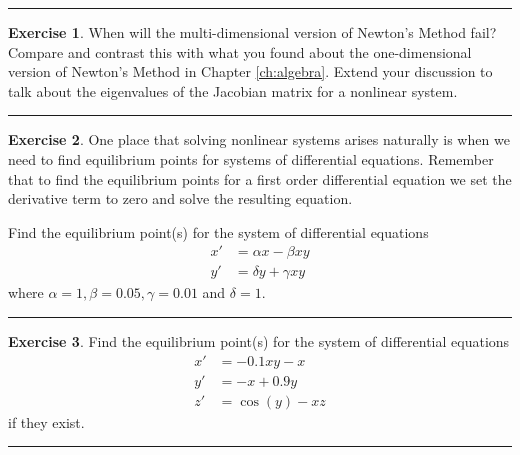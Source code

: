 \documentclass[
]{book}
\theoremstyle{definition}
\theoremstyle{definition}
\theoremstyle{definition}
\newtheorem{exercise}{Exercise}[chapter]
\theoremstyle{remark}
\begin{document}
\begin{center}\rule{0.5\linewidth}{0.5pt}\end{center}

\begin{exercise}
\protect\hypertarget{exr:unnamed-chunk-859}{}{\label{exr:unnamed-chunk-859} }When will the multi-dimensional version of Newton's Method fail? Compare and contrast this with what you found about the one-dimensional version of Newton's Method in Chapter \ref{ch:algebra}. Extend your discussion to talk about the eigenvalues of the Jacobian matrix for a nonlinear system.
\end{exercise}

\begin{center}\rule{0.5\linewidth}{0.5pt}\end{center}

\begin{exercise}
\protect\hypertarget{exr:unnamed-chunk-860}{}{\label{exr:unnamed-chunk-860} }One place that solving nonlinear systems arises naturally is when we
need to find equilibrium points for systems of differential equations.
Remember that to find the equilibrium points for a first order
differential equation we set the derivative term to zero and solve the
resulting equation.

Find the equilibrium point(s) for the system of differential equations
\[\begin{aligned}
        x' &= \alpha x - \beta xy \\
        y' &= \delta y + \gamma xy
    \end{aligned}\] where \(\alpha = 1, \beta = 0.05, \gamma = 0.01\) and
\(\delta =1\).
\end{exercise}

\begin{center}\rule{0.5\linewidth}{0.5pt}\end{center}

\begin{exercise}
\protect\hypertarget{exr:unnamed-chunk-861}{}{\label{exr:unnamed-chunk-861} }Find the equilibrium point(s) for the system of differential equations
\[\begin{aligned}
        x' &= -0.1 xy - x \\
        y' &= -x + 0.9y \\
        z' &= \cos(y) - xz
    \end{aligned}\] if they exist.
\end{exercise}

\begin{center}\rule{0.5\linewidth}{0.5pt}\end{center}
\end{document}

